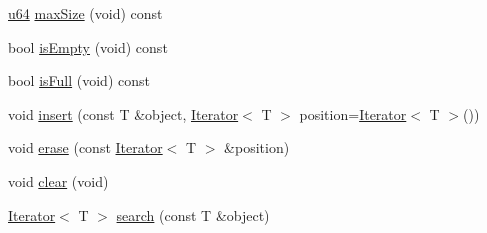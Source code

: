\begin{DoxyCompactItemize}
\hyperlink{types_8h_a3f7e2bcbb0b4c338f3c4f6c937cd4234}{u64} \hyperlink{classcrap_1_1container_1_1_deque_aca9adc5e1c43416118052aa489b7696b}{max\-Size} (void) const
\item 
bool \hyperlink{classcrap_1_1container_1_1_deque_ada910d538e236ca4a0967cfc89366fcf}{is\-Empty} (void) const
\item 
bool \hyperlink{classcrap_1_1container_1_1_deque_a09e7a4c1d549fc7a531466a7cf84e558}{is\-Full} (void) const
\item 
void \hyperlink{classcrap_1_1container_1_1_deque_ab732b59c393e7f2e05b0e9ece67a0097}{insert} (const T \&object, \hyperlink{class_iterator}{Iterator}$<$ T $>$ position=\hyperlink{class_iterator}{Iterator}$<$ T $>$())
\item 
void \hyperlink{classcrap_1_1container_1_1_deque_a36bb12d5304c40499f748e6dc46db4ae}{erase} (const \hyperlink{class_iterator}{Iterator}$<$ T $>$ \&position)
\item 
void \hyperlink{classcrap_1_1container_1_1_deque_a4cfcfaa143fc1dce1224fe2c987df2f8}{clear} (void)
\item 
\hyperlink{class_iterator}{Iterator}$<$ T $>$ \hyperlink{classcrap_1_1container_1_1_deque_a044530c2f5c4aa1687f8acc3a488fe41}{search} (const T \&object)
\end{DoxyCompactItemize}


